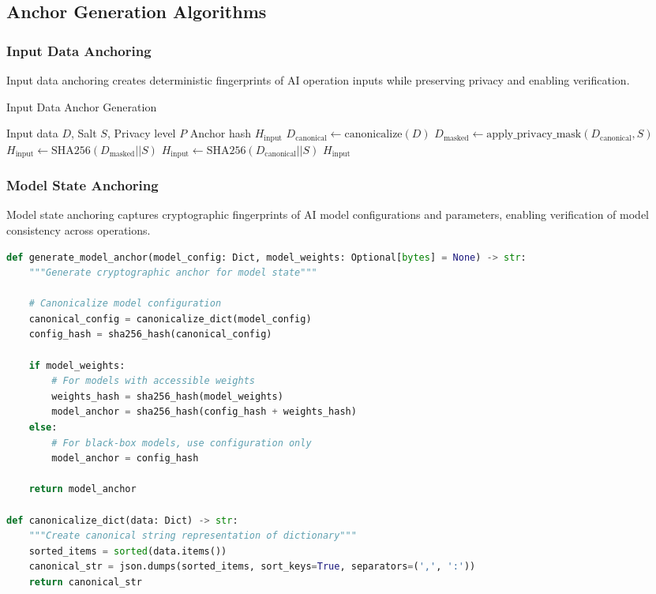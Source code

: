 \documentclass[12pt,a4paper]{article}
\begin{document}
\subsection{Anchor Generation Algorithms}

\subsubsection{Input Data Anchoring}

Input data anchoring creates deterministic fingerprints of AI operation inputs while preserving privacy and enabling verification.

\begin{algorithm}[H]
\caption{Input Data Anchor Generation}
\begin{algorithmic}[1]
\REQUIRE Input data $D$, Salt $S$, Privacy level $P$
\ENSURE Anchor hash $H_{\text{input}}$
\STATE $D_{\text{canonical}} \leftarrow \text{canonicalize}(D)$
    \STATE $D_{\text{masked}} \leftarrow \text{apply\_privacy\_mask}(D_{\text{canonical}}, S)$
    \STATE $H_{\text{input}} \leftarrow \text{SHA256}(D_{\text{masked}} || S)$
\ELSE
    \STATE $H_{\text{input}} \leftarrow \text{SHA256}(D_{\text{canonical}} || S)$
\ENDIF
\RETURN $H_{\text{input}}$
\end{algorithmic}
\end{algorithm}

\subsubsection{Model State Anchoring}

Model state anchoring captures cryptographic fingerprints of AI model configurations and parameters, enabling verification of model consistency across operations.

\begin{lstlisting}[language=Python, caption=Model State Anchor Generation]
def generate_model_anchor(model_config: Dict, model_weights: Optional[bytes] = None) -> str:
    """Generate cryptographic anchor for model state"""
    
    # Canonicalize model configuration
    canonical_config = canonicalize_dict(model_config)
    config_hash = sha256_hash(canonical_config)
    
    if model_weights:
        # For models with accessible weights
        weights_hash = sha256_hash(model_weights)
        model_anchor = sha256_hash(config_hash + weights_hash)
    else:
        # For black-box models, use configuration only
        model_anchor = config_hash
    
    return model_anchor

def canonicalize_dict(data: Dict) -> str:
    """Create canonical string representation of dictionary"""
    sorted_items = sorted(data.items())
    canonical_str = json.dumps(sorted_items, sort_keys=True, separators=(',', ':'))
    return canonical_str
\end{lstlisting}
\end{document}
